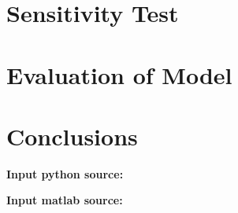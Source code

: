 \documentclass{mcmthesis}
\numberwithin{figure}{section}
\numberwithin{table}{section}
\numberwithin{equation}{section}
\begin{document}
\section{Sensitivity Test}

\section{Evaluation of Model}

\section{Conclusions}

\newpage
{}
\memodate{\today}

\begin{memo}[report]
  
\end{memo}




\newpage







\newpage


\lhead{\small\sffamily \team}

\begin{appendices}

\textbf{\textcolor[rgb]{0.98,0.00,0.00}{Input python source:}}



\textbf{\textcolor[rgb]{0.98,0.00,0.00}{Input matlab source:}}





\end{appendices}
\end{document}
